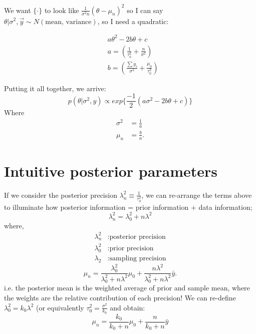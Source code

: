 \documentclass[titlepage, 12pt, leqno]{article}
\begin{document}
We want $\{\cdot\}$ to look like $\frac{1}{\sigma^{2}n}(\theta-\mu_{n})^{2}$ so I
can say $\theta|\sigma^{2}, \vec y \sim N( \text{mean, variance})$, so I need a
quadratic:

\begin{align*}
    &a\theta^{2}-2b\theta+c\\
    &a = \left(\frac{1}{\tau^{2}_{0}}+\frac{n}{\sigma^{2}}\right)\\
    &b = \left(\frac{\sum y_{i}}{\sigma^{2}} + \frac{\mu_{0}}{\tau_{0}^{2}}\right)
\end{align*}

Putting it all together, we arrive:
\[
    p(\theta|\sigma^{2},y) \propto exp\{\frac{-1}{2}(a\sigma^{2}-2b\theta+c)\}
\]
Where
\begin{align*}
    \sigma^{2} &= \frac{1}{a}\\
    \mu_{n} &= \frac{b}{a}.
\end{align*}

\pagebreak
\section{Intuitive posterior parameters}
If we consider the posterior precision $\lambda_{n}^{2}\equiv \frac{1}{\tau_{0}
^2}$, we can re-arrange the terms above to illuminate how posterior information =
prior information + data information;
\[
\lambda_{n}^{2}=\lambda_{0}^{2} + n\lambda^{2}
\]
where,
\begin{align*}
    \lambda_{n}^{2} &: \text{posterior precision}\\
    \lambda_{0}^{2} &: \text{prior precision}\\
    \lambda_{2} &: \text{sampling precision}
\end{align*}
\[
\mu_{n} = \frac{\lambda_{0}^{2}}{\lambda_{0}^{2}+n\lambda^{2}}\mu_{0} +
\frac{n\lambda^{2}}{\lambda_{0}^{2} + n\lambda^{2}}\bar y.
\]
i.e. the posterior mean is the weighted average of prior and sample mean, where
the weights are the relative contribution of each precision! We can re-define
$\lambda_{0}^{2}=k_{0}\lambda^{2}$ (or equivalently $\tau_{0}^{2}=
\frac{\sigma^{2}}{k_{0}}$ and obtain:
\[
    \mu_{n} = \frac{k_{0}}{k_{0} + n}\mu_{0}+\frac{n}{k_{0}+n}\bar y
\]
\end{document}
